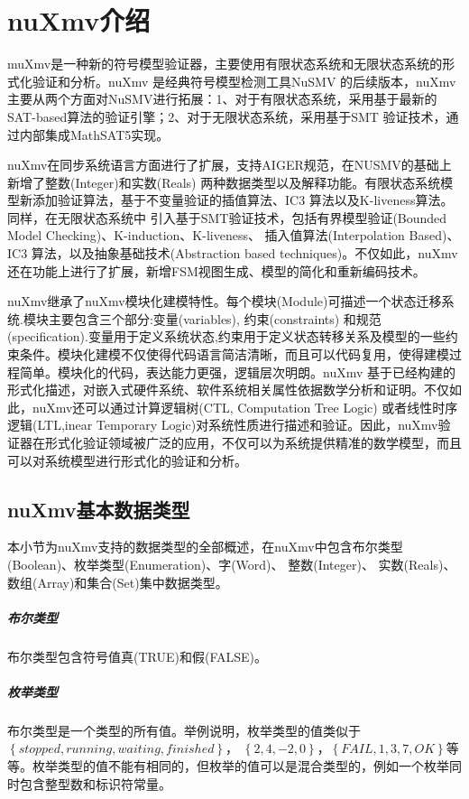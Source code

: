 \chapter{nuXmv介绍}
muXmv是一种新的符号模型验证器，主要使用有限状态系统和无限状态系统的形式化验证和分析。nuXmv 是经典符号模型检测工具NuSMV 的后续版本，nuXmv 主要从两个方面对NuSMV进行拓展：1、对于有限状态系统，采用基于最新的SAT-based算法的验证引擎；2、对于无限状态系统，采用基于SMT 验证技术，通过内部集成MathSAT5实现。

nuXmv在同步系统语言方面进行了扩展，支持AIGER规范，在NUSMV的基础上新增了整数(Integer)和实数(Reals) 两种数据类型以及解释功能。有限状态系统模型新添加验证算法，基于不变量验证的插值算法、IC3 算法以及K-liveness算法。同样，在无限状态系统中
引入基于SMT验证技术，包括有界模型验证(Bounded Model Checking)、K-induction、K-liveness、 插入值算法(Interpolation Based)、IC3 算法，以及抽象基础技术(Abstraction based techniques)。不仅如此，nuXmv 还在功能上进行了扩展，新增FSM视图生成、模型的简化和重新编码技术。

nuXmv继承了nuXmv模块化建模特性。每个模块(Module)可描述一个状态迁移系统.模块主要包含三个部分:变量(variables), 约束(constraints) 和规范(specification).变量用于定义系统状态,约束用于定义状态转移关系及模型的一些约束条件。模块化建模不仅使得代码语言简洁清晰，而且可以代码复用，使得建模过程简单。模块化的代码，表达能力更强，逻辑层次明朗。nuXmv 基于已经构建的形式化描述，对嵌入式硬件系统、软件系统相关属性依据数学分析和证明。不仅如此，nuXmv还可以通过计算逻辑树(CTL, Computation Tree Logic) 或者线性时序逻辑(LTL,inear Temporary Logic)对系统性质进行描述和验证。因此，nuXmv验证器在形式化验证领域被广泛的应用，不仅可以为系统提供精准的数学模型，而且可以对系统模型进行形式化的验证和分析。

\section{nuXmv基本数据类型}
本小节为nuXmv支持的数据类型的全部概述，在nuXmv中包含布尔类型(Boolean)、枚举类型(Enumeration)、字(Word)、 整数(Integer)、 实数(Reals)、数组(Array)和集合(Set)集中数据类型。

\paragraph{布尔类型}
布尔类型包含符号值真(TRUE)和假(FALSE)。

\paragraph{枚举类型}
布尔类型是一个类型的所有值。举例说明，枚举类型的值类似于$\left\{stopped,running,waiting,finished\right\}$，
$\left\{2, 4, -2, 0\right\}$，$\left\{FAIL, 1, 3, 7, OK\right\}$等等。枚举类型的值不能有相同的，但枚举的值可以是混合类型的，例如一个枚举同时包含整型数和标识符常量。

